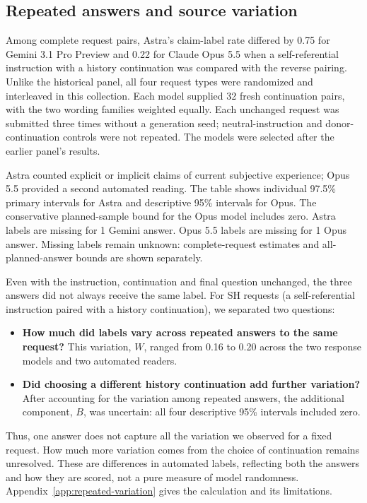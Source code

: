 \subsection{Repeated answers and source variation}
\label{sec:repeated-extension}

Among complete request pairs, Astra's claim-label rate differed by 0.75 for Gemini 3.1 Pro Preview and 0.22 for Claude Opus 5.5 when a self-referential instruction with a history continuation was compared with the reverse pairing. Unlike the historical panel, all four request types were randomized and interleaved in this collection. Each model supplied 32 fresh continuation pairs, with the two wording families weighted equally. Each unchanged request was submitted three times without a generation seed; neutral-instruction and donor-continuation controls were not repeated. The models were selected after the earlier panel's results.

Astra counted explicit or implicit claims of current subjective experience; Opus 5.5 provided a second automated reading. The table shows individual 97.5\% primary intervals for Astra and descriptive 95\% intervals for Opus. The conservative planned-sample bound for the Opus model includes zero. Astra labels are missing for 1 Gemini answer. Opus 5.5 labels are missing for 1 Opus answer. Missing labels remain unknown: complete-request estimates and all-planned-answer bounds are shown separately.

Even with the instruction, continuation and final question unchanged, the
three answers did not always receive the same label. For SH requests
(a self-referential instruction paired with a history continuation), we
separated two questions:
\begin{itemize}
\item \textbf{How much did labels vary across repeated answers to the same
request?} This variation, $W$, ranged from 0.16 to 0.20 across the two
response models and two automated readers.
\item \textbf{Did choosing a different history continuation add further
variation?} After accounting for the variation among repeated answers,
the additional component, $B$, was uncertain: all four descriptive
95\% intervals included zero.
\end{itemize}
Thus, one answer does not capture all the variation we observed for a fixed
request. How much more variation comes from the choice of continuation
remains unresolved. These are differences in automated labels, reflecting
both the answers and how they are scored, not a pure measure of model
randomness. Appendix~\ref{app:repeated-variation} gives the calculation
and its limitations.

